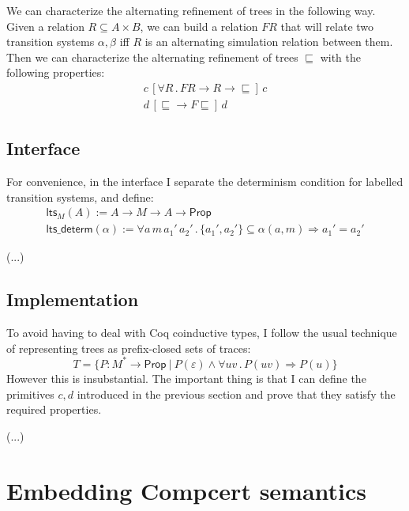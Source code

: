 \documentclass[11pt]{article}
\newcommand{\kw}[1]{{\mathsf{#1}}}
\begin{document}
We can characterize the alternating refinement of trees
in the following way.
Given a relation $R \subseteq A \times B$,
we can build a relation $F R$ that will relate
two transition systems $\alpha, \beta$ iff
$R$ is an alternating simulation relation between them.
Then we can characterize the alternating refinement of trees $\sqsubseteq$
with the following properties:
\begin{gather*}
  c \, [\forall R \, . \, F R \rightarrow R \rightarrow {\sqsubseteq}] \, c \\
  d \, [{\sqsubseteq} \rightarrow F {\sqsubseteq}] \, d
\end{gather*}

\subsection{Interface}

For convenience,
in the interface I separate the determinism condition
for labelled transition systems, and define:
\begin{gather*}
  \kw{lts}_M(A) :=
    A \rightarrow M \rightarrow A \rightarrow \kw{Prop} \\
  \kw{lts\_determ}(\alpha) :=
    \forall a \, m \, a_1' \, a_2' \,.\,
      \{ a_1', a_2' \} \subseteq \alpha(a, m) \Rightarrow
      a_1' = a_2'
\end{gather*}

(...)

\subsection{Implementation}

To avoid having to deal with Coq coinductive types,
I follow the usual technique of representing trees as
prefix-closed sets of traces:
\[
  T = \{ P : M^* \rightarrow \kw{Prop} \ \vert\ 
    P(\varepsilon) \wedge
    \forall u v \,.\, P(u v) \Rightarrow P(u) \}
\]
However this is insubstantial.
The important thing is that I can define the primitives $c, d$
introduced in the previous section and prove that they
satisfy the required properties.

(...)


\section{Embedding Compcert semantics}
\end{document}
